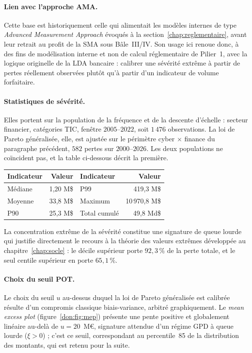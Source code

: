 \paragraph{Lien avec l'approche AMA.} Cette base est historiquement celle
qui alimentait les modèles internes de type \emph{Advanced Measurement
Approach} évoqués à la section~\ref{chap:reglementaire}, avant leur retrait au profit de la SMA sous
Bâle~III/IV. Son usage ici renoue donc, à des fins de modélisation interne et
non de calcul réglementaire de Pilier~1, avec la logique originelle de la LDA
bancaire : calibrer une sévérité extrême à partir de pertes réellement
observées plutôt qu'à partir d'un indicateur de volume forfaitaire.

\paragraph{Statistiques de sévérité.} Elles portent sur la population de la fréquence et de la
descente d'échelle : secteur financier, catégories TIC, fenêtre $2005$--$2022$, soit
$1\,476$ observations. La loi de Pareto généralisée, elle, est ajustée sur le périmètre cyber
$\times$ finance du paragraphe précédent, $582$ pertes sur $2000$--$2026$. Les deux populations
ne coïncident pas, et la table ci-dessous décrit la première.

\begin{center}
\renewcommand{\arraystretch}{1.3}
\begin{tabular}{l r l r}
\toprule
\rowcolor{lightblue}
\textbf{Indicateur} & \textbf{Valeur} & \textbf{Indicateur} & \textbf{Valeur} \\
\midrule
Médiane & 1{,}20 M\$ & P99 & 419{,}3 M\$ \\
Moyenne & 33{,}8 M\$ & Maximum & 10\,970{,}8 M\$ \\
P90 & 25{,}3 M\$ & Total cumulé & 49{,}8 Md\$ \\
\bottomrule
\end{tabular}
\end{center}

La concentration extrême de la sévérité constitue une signature de queue lourde qui justifie
directement le recours à la théorie des valeurs extrêmes développée au
chapitre~\ref{chap:socle} : le décile supérieur porte $92{,}3\,\%$ de la perte totale, et le
seul centile supérieur en porte $65{,}1\,\%$.


\paragraph{Choix du seuil POT.} Le choix du seuil $u$ au-dessus duquel la loi
de Pareto généralisée est calibrée résulte d'un compromis classique
biais-variance, arbitré graphiquement. Le \emph{mean excess plot}
(figure~\ref{don:fig:mep}) présente une pente positive et globalement linéaire
au-delà de $u = 20$~M\euro, signature attendue d'un régime GPD à queue lourde
($\xi > 0$) ; c'est ce seuil, correspondant au percentile~85 de la
distribution des montants, qui est retenu pour la suite.

